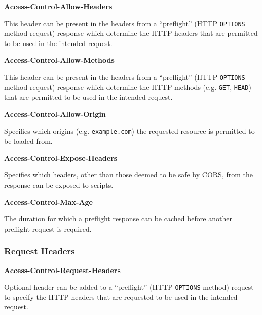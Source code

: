 \documentclass{mscreport}
\begin{document}
\vspace{0.7cm} \noindent
\textbf{Access-Control-Allow-Headers}

\vspace{0.3cm} \noindent
This header can be present in the headers from a ``preflight'' (HTTP \texttt{OPTIONS} method request) response which determine the HTTP headers that are permitted to be used in the intended request.

\vspace{0.7cm} \noindent
\textbf{Access-Control-Allow-Methods}

\vspace{0.3cm} \noindent
This header can be present in the headers from a ``preflight'' (HTTP \texttt{OPTIONS} method request) response which determine the HTTP methods (e.g. \texttt{GET}, \texttt{HEAD}) that are permitted to be used in the intended request.

\vspace{0.7cm} \noindent
\textbf{Access-Control-Allow-Origin}

\vspace{0.3cm} \noindent
Specifies which origins (e.g. \texttt{example.com}) the requested resource is permitted to be loaded from.

\vspace{0.7cm} \noindent
\textbf{Access-Control-Expose-Headers}

\vspace{0.3cm} \noindent
Specifies which headers, other than those deemed to be safe by CORS, from the response can be exposed to scripts.

\vspace{0.7cm} \noindent
\textbf{Access-Control-Max-Age}

\vspace{0.3cm} \noindent
The duration for which a preflight response can be cached before another preflight request is required.

\subsubsection{Request Headers}
\vspace{0.7cm} \noindent
\textbf{Access-Control-Request-Headers}

\vspace{0.3cm} \noindent
Optional header can be added to a ``preflight'' (HTTP \texttt{OPTIONS} method) request to specify the HTTP headers that are requested to be used in the intended request.
\end{document}
